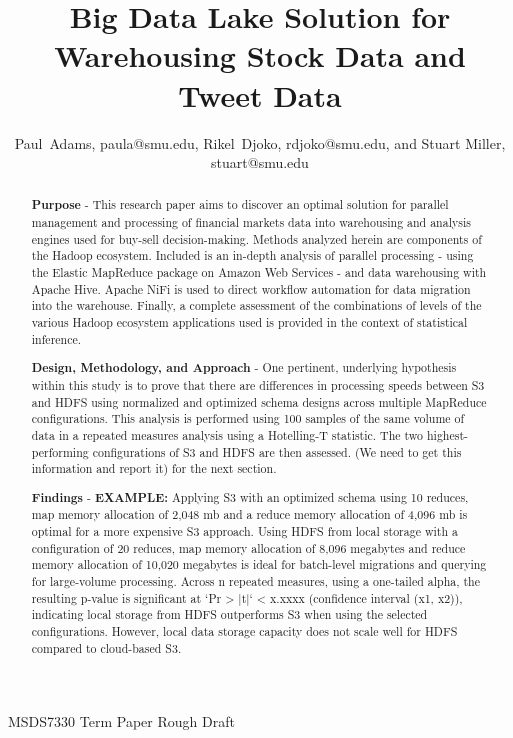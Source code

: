 \documentclass[journal]{IEEEtran}
\begin{document}
	
	\title{Big Data Lake Solution for\\ 
		Warehousing Stock Data and Tweet Data}
	
	\author{Paul~Adams, paula@smu.edu,
		Rikel~Djoko, rdjoko@smu.edu,
		and Stuart Miller, stuart@smu.edu}%
	
	{MSDS7330 Term Paper Rough Draft}
	
	\maketitle
	
	\begin{abstract}
		\textbf{Purpose} - This research paper aims to discover an optimal solution for parallel management and processing of financial markets data into  warehousing and analysis engines used for buy-sell decision-making. Methods analyzed herein are components of the Hadoop ecosystem. Included is an in-depth analysis of parallel processing - using the Elastic MapReduce package on Amazon Web Services - and data warehousing with Apache Hive. Apache NiFi is used to direct workflow automation for data migration into the warehouse. Finally, a complete assessment of the combinations of levels of the various Hadoop ecosystem applications used is provided in the context of statistical inference.
		
		\textbf{Design, Methodology, and Approach} - One pertinent, underlying hypothesis within this study is to prove that there are differences in processing speeds between S3 and HDFS using normalized and optimized schema designs across multiple MapReduce configurations. This analysis is performed using 100 samples of the same volume of data in a repeated measures analysis using a Hotelling-T statistic. The two highest-performing configurations of S3 and HDFS are then assessed. (We need to get this information and report it) for the next section.
		
		\textbf{Findings} - \textbf{EXAMPLE:} Applying S3 with an optimized schema using 10 reduces, map memory allocation of 2,048 mb and a reduce memory allocation of 4,096 mb is optimal for a more expensive S3 approach. Using HDFS from local storage with a configuration of 20 reduces, map memory allocation of 8,096 megabytes and reduce memory allocation of 10,020 megabytes is ideal for batch-level migrations and querying for large-volume processing. Across n repeated measures, using a one-tailed alpha, the resulting p-value is significant at `Pr > |t|` < x.xxxx (confidence interval (x1, x2)), indicating local storage from HDFS outperforms S3 when using the selected configurations. However, local data storage capacity does not scale well for HDFS compared to cloud-based S3.
	\end{abstract}
	
\end{document}
